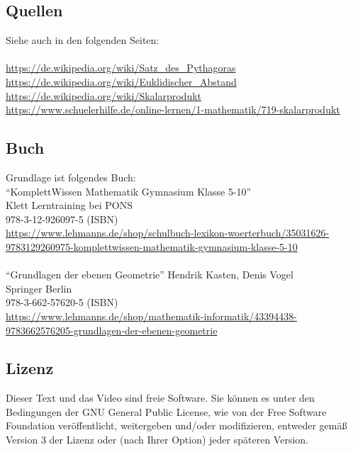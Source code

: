 \documentclass[a4paper]{amsart}
\theoremstyle{definition}
\begin{document}
\subsection*{Quellen}
Siehe auch in den folgenden Seiten:\\
\\
\url{https://de.wikipedia.org/wiki/Satz_des_Pythagoras}\\
\url{https://de.wikipedia.org/wiki/Euklidischer_Abstand}\\
\url{https://de.wikipedia.org/wiki/Skalarprodukt}\\
\url{https://www.schuelerhilfe.de/online-lernen/1-mathematik/719-skalarprodukt}\\

\subsection*{Buch}
Grundlage ist folgendes Buch:\\

"`KomplettWissen Mathematik Gymnasium Klasse 5-10"'\\
Klett Lerntraining bei PONS\\
978-3-12-926097-5 (ISBN)\\
{\tiny
   \url{https://www.lehmanns.de/shop/schulbuch-lexikon-woerterbuch/35031626-9783129260975-komplettwissen-mathematik-gymnasium-klasse-5-10
   }
}\\
\\
"`Grundlagen der ebenen Geometrie"'
Hendrik Kasten, Denis Vogel\\
Springer Berlin\\
978-3-662-57620-5 (ISBN)\\
{\tiny
   \url{
      https://www.lehmanns.de/shop/mathematik-informatik/43394438-9783662576205-grundlagen-der-ebenen-geometrie
   }
}

\subsection*{Lizenz}
Dieser Text und das Video sind freie Software. Sie können es unter den Bedingungen der 
GNU General Public License, wie von der Free Software Foundation veröffentlicht, weitergeben 
und/oder modifizieren, entweder gemäß Version 3 der Lizenz oder (nach Ihrer Option) jeder späteren Version.
\end{document}
